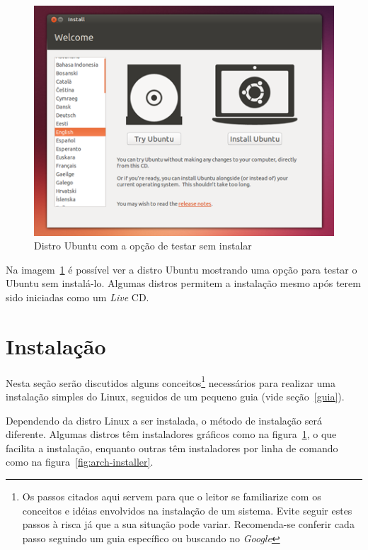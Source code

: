 \documentclass{handout_utfpr}
\begin{document}
\begin{figure}[!h]
  \centering
  \includegraphics[scale=.5]{imagens/ubuntu-livecd.png}
  \caption{Distro Ubuntu com a opção de testar sem instalar}
  \label{fig:ubuntu-live}
\end{figure}

Na imagem~\ref{fig:ubuntu-live} é possível ver a distro Ubuntu mostrando uma opção para testar o Ubuntu sem instalá-lo. Algumas distros permitem a instalação mesmo após terem sido iniciadas como um \textit{Live} CD.

\section{Instalação}
Nesta seção serão discutidos alguns conceitos\footnote{Os passos citados aqui servem para que o leitor se familiarize com os conceitos e idéias envolvidos na instalação de um sistema. Evite seguir estes passos à risca já que a sua situação pode variar. Recomenda-se conferir cada passo seguindo um guia específico ou buscando no \emph{Google}} necessários para realizar uma instalação simples do Linux, seguidos de um pequeno guia (vide seção~\ref{guia}).

Dependendo da distro Linux a ser instalada, o método de instalação será diferente. Algumas distros têm instaladores gráficos como na figura~\ref{fig:ubuntu-live}, o que facilita a instalação, enquanto outras têm instaladores por linha de comando como na figura~\ref{fig:arch-installer}.
\end{document}

